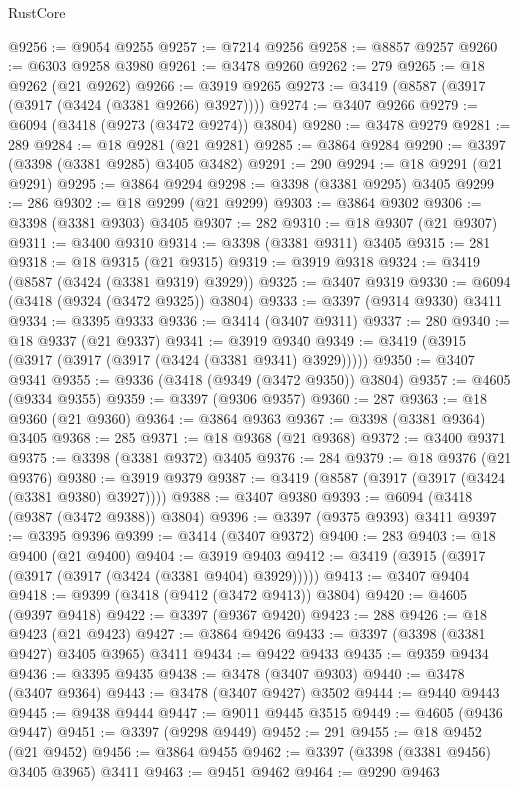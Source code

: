 \begin{lexlean}{RustCore}
\begin{coremodule}
@9256 := @9054 @9255
@9257 := @7214 @9256
@9258 := @8857 @9257
@9260 := @6303 @9258 @3980
@9261 := @3478 @9260
@9262 := 279
@9265 := @18 @9262 (@21 @9262)
@9266 := @3919 @9265
@9273 := @3419 (@8587 (@3917 (@3917 (@3424 (@3381 @9266) @3927))))
@9274 := @3407 @9266
@9279 := @6094 (@3418 (@9273 (@3472 @9274)) @3804)
@9280 := @3478 @9279
@9281 := 289
@9284 := @18 @9281 (@21 @9281)
@9285 := @3864 @9284
@9290 := @3397 (@3398 (@3381 @9285) @3405 @3482)
@9291 := 290
@9294 := @18 @9291 (@21 @9291)
@9295 := @3864 @9294
@9298 := @3398 (@3381 @9295) @3405
@9299 := 286
@9302 := @18 @9299 (@21 @9299)
@9303 := @3864 @9302
@9306 := @3398 (@3381 @9303) @3405
@9307 := 282
@9310 := @18 @9307 (@21 @9307)
@9311 := @3400 @9310
@9314 := @3398 (@3381 @9311) @3405
@9315 := 281
@9318 := @18 @9315 (@21 @9315)
@9319 := @3919 @9318
@9324 := @3419 (@8587 (@3424 (@3381 @9319) @3929))
@9325 := @3407 @9319
@9330 := @6094 (@3418 (@9324 (@3472 @9325)) @3804)
@9333 := @3397 (@9314 @9330) @3411
@9334 := @3395 @9333
@9336 := @3414 (@3407 @9311)
@9337 := 280
@9340 := @18 @9337 (@21 @9337)
@9341 := @3919 @9340
@9349 := @3419 (@3915 (@3917 (@3917 (@3917 (@3424 (@3381 @9341) @3929)))))
@9350 := @3407 @9341
@9355 := @9336 (@3418 (@9349 (@3472 @9350)) @3804)
@9357 := @4605 (@9334 @9355)
@9359 := @3397 (@9306 @9357)
@9360 := 287
@9363 := @18 @9360 (@21 @9360)
@9364 := @3864 @9363
@9367 := @3398 (@3381 @9364) @3405
@9368 := 285
@9371 := @18 @9368 (@21 @9368)
@9372 := @3400 @9371
@9375 := @3398 (@3381 @9372) @3405
@9376 := 284
@9379 := @18 @9376 (@21 @9376)
@9380 := @3919 @9379
@9387 := @3419 (@8587 (@3917 (@3917 (@3424 (@3381 @9380) @3927))))
@9388 := @3407 @9380
@9393 := @6094 (@3418 (@9387 (@3472 @9388)) @3804)
@9396 := @3397 (@9375 @9393) @3411
@9397 := @3395 @9396
@9399 := @3414 (@3407 @9372)
@9400 := 283
@9403 := @18 @9400 (@21 @9400)
@9404 := @3919 @9403
@9412 := @3419 (@3915 (@3917 (@3917 (@3917 (@3424 (@3381 @9404) @3929)))))
@9413 := @3407 @9404
@9418 := @9399 (@3418 (@9412 (@3472 @9413)) @3804)
@9420 := @4605 (@9397 @9418)
@9422 := @3397 (@9367 @9420)
@9423 := 288
@9426 := @18 @9423 (@21 @9423)
@9427 := @3864 @9426
@9433 := @3397 (@3398 (@3381 @9427) @3405 @3965) @3411
@9434 := @9422 @9433
@9435 := @9359 @9434
@9436 := @3395 @9435
@9438 := @3478 (@3407 @9303)
@9440 := @3478 (@3407 @9364)
@9443 := @3478 (@3407 @9427) @3502
@9444 := @9440 @9443
@9445 := @9438 @9444
@9447 := @9011 @9445 @3515
@9449 := @4605 (@9436 @9447)
@9451 := @3397 (@9298 @9449)
@9452 := 291
@9455 := @18 @9452 (@21 @9452)
@9456 := @3864 @9455
@9462 := @3397 (@3398 (@3381 @9456) @3405 @3965) @3411
@9463 := @9451 @9462
@9464 := @9290 @9463

\end{coremodule}
\end{lexlean}
